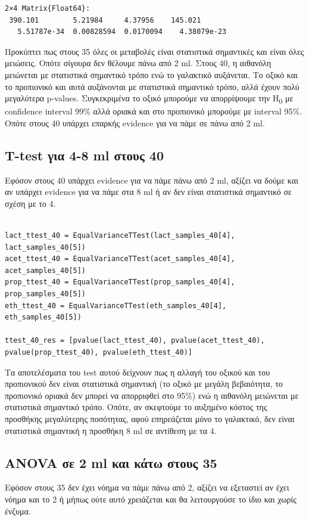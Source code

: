 \documentclass[11pt]{article}
\begin{document}
\begin{verbatim}
2×4 Matrix{Float64}:
 390.101        5.21984     4.37956    145.021
   5.51787e-34  0.00828594  0.0170094    4.38079e-23
\end{verbatim}


Προκύπτει πως στους 35 όλες οι μεταβολές είναι στατιστικά σημαντικές και είναι όλες μειώσεις. Οπότε σίγουρα δεν θέλουμε πάνω από 2 ml. Στους 40, η αιθανόλη μειώνεται με στατιστικά σημαντικό τρόπο ενώ το γαλακτικό αυξάνεται. Το οξικό και το προπιονικό και αυτά αυξάνονται με στατιστικά σημαντικό τρόπο, αλλά έχουν πολύ μεγαλύτερα p-values. Συγκεκριμένα το οξικό μπορούμε να απορρίψουμε την H\textsubscript{0} με confidence interval 99\% αλλά οριακά και στο προπιονικό μπορούμε με interval 95\%. Οπότε στους 40 υπάρχει επαρκής evidence για να πάμε σε πάνω από 2 ml.

\subsection{T-test για 4-8 ml στους 40}
\label{sec:org52c6662}
Εφόσον στους 40 υπάρχει evidence για να πάμε πάνω από 2 ml, αξίζει να δούμε και αν υπάρχει evidence για να πάμε στα 8 ml ή αν δεν είναι στατιστικά σημαντικό σε σχέση με το 4.

\begin{verbatim}

lact_ttest_40 = EqualVarianceTTest(lact_samples_40[4], lact_samples_40[5])
acet_ttest_40 = EqualVarianceTTest(acet_samples_40[4], acet_samples_40[5])
prop_ttest_40 = EqualVarianceTTest(prop_samples_40[4], prop_samples_40[5])
eth_ttest_40 = EqualVarianceTTest(eth_samples_40[4], eth_samples_40[5])

ttest_40_res = [pvalue(lact_ttest_40), pvalue(acet_ttest_40), pvalue(prop_ttest_40), pvalue(eth_ttest_40)]
\end{verbatim}

Τα αποτελέσματα του test αυτού δείχνουν πως η αλλαγή του οξικού και του προπιονικού δεν είναι στατιστικά σημαντική (το οξικό με μεγάλη βεβαιότητα, το προπιονικό οριακά δεν μπορεί να απορριφθεί στο 95\%) ενώ η αιθανόλη μειώνεται με στατιστικά σημαντικό τρόπο. Οπότε, αν σκεφτούμε το αυξημένο κόστος της προσθήκης μεγαλύτερης ποσότητας, αφού επηρεάζεται μόνο το γαλακτικό, δεν είναι στατιστικά σημαντική η προσθήκη 8 ml σε αντίθεση με τα 4.

\subsection{ANOVA σε 2 ml και κάτω στους 35}
\label{sec:org1a71968}
Εφόσον στους 35 δεν έχει νόημα να πάμε πάνω από 2, αξίζει να εξεταστεί αν έχει νόημα και το 2 ή μήπως ούτε αυτό χρειάζεται και θα λειτουργούσε το ίδιο και χωρίς ένζυμα.
\end{document}
